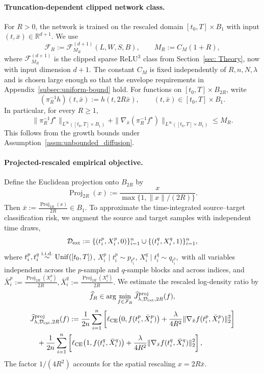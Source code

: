 \documentclass[11pt]{article}
\theoremstyle{plain}
\theoremstyle{definition}
\theoremstyle{remark}
\begin{document}
\paragraph{Truncation-dependent clipped network class.}
For \(R>0\), the network is trained on the rescaled domain
\([t_0,T]\times B_1\) with input \((t,\bar x)\in\mathbb R^{d+1}\). We use
\[
\mathcal F_R:=
\mathcal F^{(d+1)}_{M_R}(L,W,S,B),
\qquad
M_R:=C_M(1+R),
\]
where \(\mathcal F^{(d+1)}_{M_R}\) is the clipped sparse ReLU\(^3\) class
from Section~\ref{sec: Theory}, now with input dimension \(d+1\). The constant
\(C_M\) is fixed independently of \(R,n,N,\lambda\) and is chosen large enough
so that the envelope requirements in Appendix~\ref{subsec:uniform-bound} hold.
For functions on \([t_0,T]\times B_{2R}\), write
\[
(\pi_R^{-1}h)(t,\bar x):=h(t,2R\bar x),
\qquad (t,\bar x)\in [t_0,T]\times B_1.
\]
In particular, for every \(R\ge1\),
\[
\|\pi_R^{-1}f^\star\|_{L^\infty([t_0,T]\times B_1)}
+
\|\nabla_{\bar x}(\pi_R^{-1}f^\star)\|_{L^\infty([t_0,T]\times B_1)}
\le M_R.
\]
This follows from the growth bounds under
Assumption~\ref{assm:unbounded_diffusion}.

\paragraph{Projected-rescaled empirical objective.}
Define the Euclidean projection onto \(B_{2R}\) by
\[
{\operatorname{Proj}_{2R}}(x):=\frac{x}{\max\{1,\|x\|/(2R)\}}.\]
Then $\bar x:=\frac{{\operatorname{Proj}_{2R}}(x)}{2R}\in B_1.$
To approximate the time-integrated source--target classification risk, we
augment the source and target samples with independent time draws,
\[
\mathcal D_{\rm ext}:=
\{(t_i^p,X_i^p,0)\}_{i=1}^n
\cup
\{(t_i^q,X_i^q,1)\}_{i=1}^n,
\]
where $t_i^p,t_i^q\stackrel{\rm i.i.d.}{\sim}{\rm Unif}([t_0,T])$, $X_i^p\mid t_i^p \sim p_{t_i^p}$,
$X_i^q\mid t_i^q \sim q_{t_i^q},$
with all variables independent across the \(p\)-sample and \(q\)-sample
blocks and across indices, and $\bar X_i^p:=\frac{{\operatorname{Proj}_{2R}}(X_i^p)}{2R}, \bar X_i^q:=\frac{{\operatorname{Proj}_{2R}}(X_i^q)}{2R}.$ We estimate the rescaled log-density ratio by
\[
\widehat f_R
\in
\arg\min_{f\in\mathcal F_R} \widehat J^{\rm proj}_{\lambda,\mathcal D_{\rm ext},2R}(f),
\]
\begin{equation}\label{eq:empirical_objective_proj}
\begin{aligned}
  &\widehat J^{\rm proj}_{\lambda,\mathcal D_{\rm ext},2R}(f):= \frac1{2n}\sum_{i=1}^n
\left[
\ell_{\rm CE}\big(0,f(t_i^p,\bar X_i^p)\big)
+
\frac{\lambda}{4R^2}
\|\nabla_{\bar x}f(t_i^p,\bar X_i^p)\|_2^2
\right]\\
&\quad+
\frac1{2n}\sum_{i=1}^n
\left[
\ell_{\rm CE}\big(1,f(t_i^q,\bar X_i^q)\big)
+
\frac{\lambda}{4R^2}
\|\nabla_{\bar x}f(t_i^q,\bar X_i^q)\|_2^2
\right],
\end{aligned}
\end{equation}
The factor \(1/(4R^2)\) accounts for the spatial rescaling
\(x=2R\bar x\).
\end{document}
